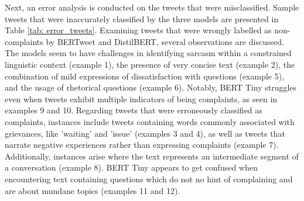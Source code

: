 Next, an error analysis is conducted on the tweets that were misclassified. Sample tweets that were inaccurately classified by the three models are presented in Table \ref{tab: error_tweets}. Examining tweets that were wrongly labelled as non-complaints by BERTweet and DistilBERT, several observations are discussed. The models seem to have challenges in identifying sarcasm within a constrained linguistic context (example 1), the presence of very concise text (example 2), the combination of mild expressions of dissatisfaction with questions (example 5), and the usage of rhetorical questions (example 6). Notably, BERT Tiny struggles even when tweets exhibit multiple indicators of being complaints, as seen in examples 9 and 10. Regarding tweets that were erroneously classified as complaints, instances include tweets containing words commonly associated with grievances, like 'waiting' and 'issue' (examples 3 and 4), as well as tweets that narrate negative experiences rather than expressing complaints (example 7). Additionally, instances arise where the text represents an intermediate segment of a conversation (example 8). BERT Tiny appears to get confused when encountering text containing questions which do not no hint of complaining and are about mundane topics  (examples 11 and 12).

